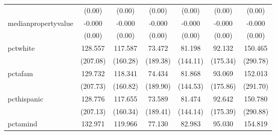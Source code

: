 {\begin{tabular}{l*{6}{c}}
            &                   (0.00)         &                   (0.00)         &                   (0.00)         &                   (0.00)         &                   (0.00)         &                   (0.00)         \\
medianpropertyvalue&                   -0.000         &                   -0.000         &                   -0.000         &                   -0.000         &                   -0.000         &                   -0.000         \\
            &                   (0.00)         &                   (0.00)         &                   (0.00)         &                   (0.00)         &                   (0.00)         &                   (0.00)         \\
pctwhite    &                  128.557         &                  117.587         &                   73.472         &                   81.198         &                   92.132         &                  150.465         \\
            &                 (207.08)         &                 (160.28)         &                 (189.38)         &                 (144.11)         &                 (175.34)         &                 (290.78)         \\
pctafam     &                  129.732         &                  118.341         &                   74.434         &                   81.868         &                   93.069         &                  152.013         \\
            &                 (207.73)         &                 (160.82)         &                 (189.90)         &                 (144.53)         &                 (175.86)         &                 (291.70)         \\
pcthispanic &                  128.776         &                  117.655         &                   73.589         &                   81.474         &                   92.642         &                  150.780         \\
            &                 (207.13)         &                 (160.34)         &                 (189.41)         &                 (144.14)         &                 (175.39)         &                 (290.88)         \\
pctamind    &                  132.971         &                  119.966         &                   77.130         &                   82.983         &                   95.030         &                  154.819         \\

\end{tabular}}

